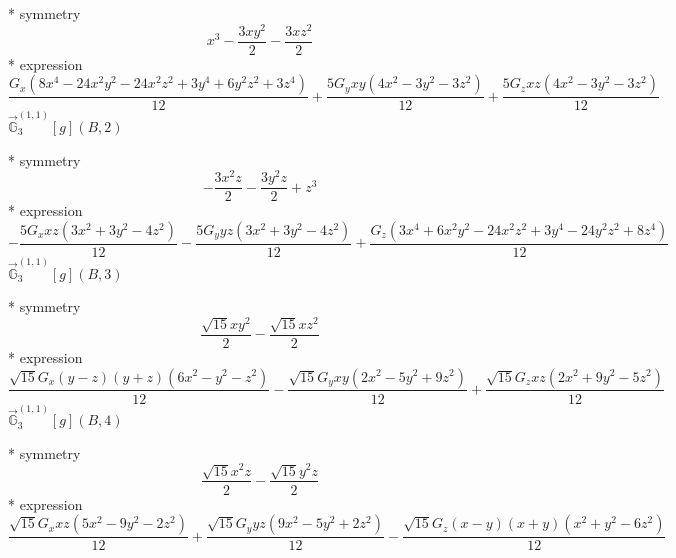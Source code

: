 \documentclass[fleqn,8pt]{jsarticle}
\begin{document}
\noindent\quad ** symmetry
\begin{dmath*}
x^{3} - \frac{3 x y^{2}}{2} - \frac{3 x z^{2}}{2}
\end{dmath*}
\noindent\quad ** expression
\begin{dmath*}
\frac{G_{x} \left(8 x^{4} - 24 x^{2} y^{2} - 24 x^{2} z^{2} + 3 y^{4} + 6 y^{2} z^{2} + 3 z^{4}\right)}{12} + \frac{5 G_{y} x y \left(4 x^{2} - 3 y^{2} - 3 z^{2}\right)}{12} + \frac{5 G_{z} x z \left(4 x^{2} - 3 y^{2} - 3 z^{2}\right)}{12}
\end{dmath*}
\noindent\quad $\vec{\mathbb{G}}_{3}^{(1,1)}[g](B,2)$

\noindent\quad ** symmetry
\begin{dmath*}
- \frac{3 x^{2} z}{2} - \frac{3 y^{2} z}{2} + z^{3}
\end{dmath*}
\noindent\quad ** expression
\begin{dmath*}
- \frac{5 G_{x} x z \left(3 x^{2} + 3 y^{2} - 4 z^{2}\right)}{12} - \frac{5 G_{y} y z \left(3 x^{2} + 3 y^{2} - 4 z^{2}\right)}{12} + \frac{G_{z} \left(3 x^{4} + 6 x^{2} y^{2} - 24 x^{2} z^{2} + 3 y^{4} - 24 y^{2} z^{2} + 8 z^{4}\right)}{12}
\end{dmath*}
\noindent\quad $\vec{\mathbb{G}}_{3}^{(1,1)}[g](B,3)$

\noindent\quad ** symmetry
\begin{dmath*}
\frac{\sqrt{15} x y^{2}}{2} - \frac{\sqrt{15} x z^{2}}{2}
\end{dmath*}
\noindent\quad ** expression
\begin{dmath*}
\frac{\sqrt{15} G_{x} \left(y - z\right) \left(y + z\right) \left(6 x^{2} - y^{2} - z^{2}\right)}{12} - \frac{\sqrt{15} G_{y} x y \left(2 x^{2} - 5 y^{2} + 9 z^{2}\right)}{12} + \frac{\sqrt{15} G_{z} x z \left(2 x^{2} + 9 y^{2} - 5 z^{2}\right)}{12}
\end{dmath*}
\noindent\quad $\vec{\mathbb{G}}_{3}^{(1,1)}[g](B,4)$

\noindent\quad ** symmetry
\begin{dmath*}
\frac{\sqrt{15} x^{2} z}{2} - \frac{\sqrt{15} y^{2} z}{2}
\end{dmath*}
\noindent\quad ** expression
\begin{dmath*}
\frac{\sqrt{15} G_{x} x z \left(5 x^{2} - 9 y^{2} - 2 z^{2}\right)}{12} + \frac{\sqrt{15} G_{y} y z \left(9 x^{2} - 5 y^{2} + 2 z^{2}\right)}{12} - \frac{\sqrt{15} G_{z} \left(x - y\right) \left(x + y\right) \left(x^{2} + y^{2} - 6 z^{2}\right)}{12}
\end{dmath*}
\end{document}
